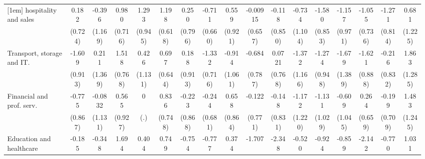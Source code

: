 {\begin{tabular}{l*{16}{c}}
[1em]
hospitality and sales&       0.182         &      -0.396         &       0.980         &       1.293         &       1.198         &       0.250         &      -0.711         &       0.559         &    -0.00915         &      -0.118         &      -0.734         &      -1.580         &      -1.157         &      -1.055         &      -1.271         &       0.681         \\
                    &     (0.724)         &     (1.169)         &     (0.716)         &     (0.945)         &     (0.618)         &     (0.796)         &     (0.660)         &     (0.921)         &     (0.657)         &     (0.850)         &     (1.104)         &     (0.853)         &     (0.971)         &     (0.736)         &     (0.814)         &     (1.225)         \\
[1em]
Transport, storage and IT.&      -1.609         &       0.211         &       1.518\sym{*}  &       0.426         &       0.697         &       0.188         &      -1.332         &      -0.914         &      -0.684         &      0.0721         &      -1.372         &      -1.274         &      -1.679         &      -1.621         &      -0.216         &       1.863         \\
                    &     (0.913)         &     (1.369)         &     (0.768)         &     (1.131)         &     (0.644)         &     (0.913)         &     (0.716)         &     (1.061)         &     (0.787)         &     (0.768)         &     (1.166)         &     (0.948)         &     (1.389)         &     (0.888)         &     (0.832)         &     (1.285)         \\
[1em]
Financial and prof. serv.&      -0.775         &     -0.0832         &       0.565         &           0         &       0.836         &      -0.223         &      -0.244         &       0.658         &      -0.122         &      -0.148         &      -1.172         &      -1.131         &      -0.609         &       0.264         &      -0.199         &       1.483         \\
                    &     (0.867)         &     (1.131)         &     (0.927)         &         (.)         &     (0.748)         &     (0.868)         &     (0.681)         &     (0.864)         &     (0.771)         &     (0.831)         &     (1.220)         &     (1.029)         &     (1.045)         &     (0.659)         &     (0.709)         &     (1.245)         \\
[1em]
Education and healthcare&      -0.185         &      -0.348         &       1.694\sym{*}  &       0.404         &       0.749         &      -0.754         &      -0.777         &       0.374         &      -1.707         &      -2.348\sym{*}  &      -0.520         &      -0.924         &      -0.859         &      -2.142\sym{*}  &      -0.770         &       1.031         \\

\end{tabular}}
